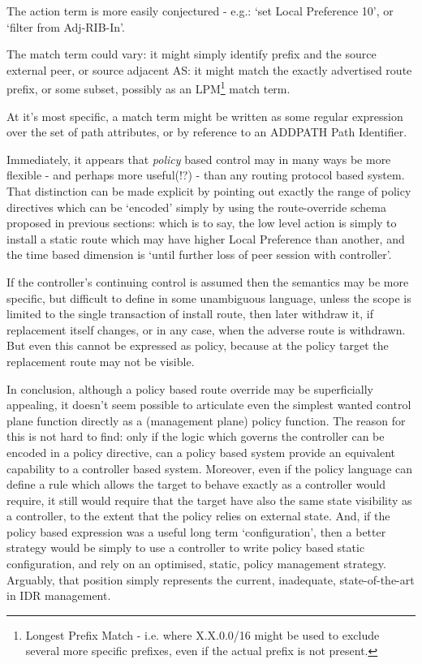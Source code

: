 The action term is more easily conjectured - e.g.: `set Local Preference 10', or `filter from Adj-RIB-In'.

The match term could vary: it might simply identify prefix and the source external peer, or source adjacent AS: it might match the exactly advertised route prefix, or some subset, possibly as an LPM\footnote{Longest Prefix Match - i.e. where X.X.0.0/16 might be used to exclude several more specific prefixes, even if the actual prefix is not present.} match term.

At it's most specific, a match term might be written as some regular expression over the set of path attributes, or by reference to an ADDPATH Path Identifier.
\medskip

Immediately, it appears that \textit{policy} based control may in many ways be more flexible - and perhaps more useful(!?) - than any routing protocol based system.  That distinction can be made explicit by pointing out exactly the range of policy directives which can be `encoded' simply by using the route-override schema proposed in previous sections: which is to say, the low level action is simply to install a static route which may have higher Local Preference than another, and the time based dimension is `until further loss of peer session with controller'.

If the controller's continuing control is assumed then the semantics may be more specific, but difficult to define in some unambiguous language, unless the scope is limited to the single transaction of install route, then later withdraw it, if replacement itself changes,  or in any case, when the adverse route is withdrawn.  But even this cannot be expressed as policy, because at the policy target the replacement route may not be visible.

In conclusion, although a policy based route override may be superficially appealing, it doesn't seem possible to articulate even the simplest wanted control plane function directly as a (management plane) policy function.  The reason for this is not hard to find: only if the logic which governs the controller can be encoded in a policy directive, can a policy based system provide an equivalent capability to a controller based system.  Moreover, even if the policy language can define a rule which allows the target to behave exactly as a controller would require, it still would require that the target have also the same state visibility as a controller, to the extent that the policy relies on external state.  And, if the policy based expression was a useful long term `configuration', then a better strategy would be simply to use a controller to write policy based static configuration, and rely on an optimised, static, policy management strategy.  Arguably, that position simply represents the current, inadequate, state-of-the-art in IDR management.


